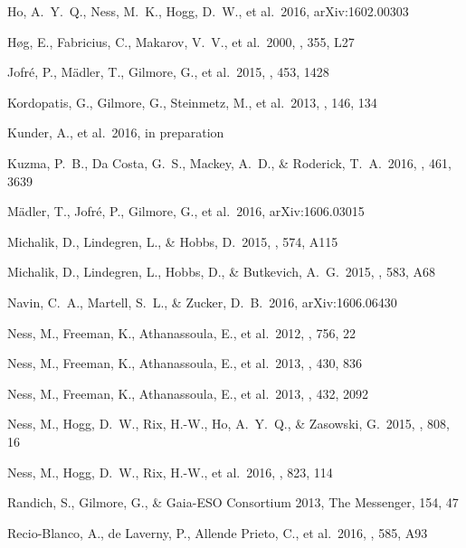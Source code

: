 \documentclass[preprint,trackchanges]{aastex}
\begin{document}
\begin{thebibliography}{dummy}
 Ho, A.~Y.~Q., Ness, M.~K., Hogg, D.~W., et al.\ 2016, arXiv:1602.00303 
 
 H{\o}g, E., Fabricius, C., Makarov, V.~V., et al.\ 2000, \aap, 355, L27 

 Jofr{\'e}, P., M{\"a}dler, T., Gilmore, G., et al.\ 2015, \mnras, 453, 1428 

 Kordopatis, G., Gilmore, G., Steinmetz, M., et al.\ 2013, \aj, 146, 134 

 Kunder, A., et al.\ 2016, in preparation

 Kuzma, P.~B., Da Costa, G.~S., Mackey, A.~D., \& Roderick, T.~A.\ 2016, \mnras, 461, 3639 

 M{\"a}dler, T., Jofr{\'e}, P., Gilmore, G., et al.\ 2016, arXiv:1606.03015 

 Michalik, D., Lindegren, L., \& Hobbs, D.\ 2015, \aap, 574, A115 

 Michalik, D., Lindegren, L., Hobbs, D., \& Butkevich, A.~G.\ 2015, \aap, 583, A68 

 Navin, C.~A., Martell, S.~L., \& Zucker, D.~B.\ 2016, arXiv:1606.06430 

 Ness, M., Freeman, K., Athanassoula, E., et al.\ 2012, \apj, 756, 22 

 Ness, M., Freeman, K., Athanassoula, E., et al.\ 2013, \mnras, 430, 836 

 Ness, M., Freeman, K., Athanassoula, E., et al.\ 2013, \mnras, 432, 2092 

 Ness, M., Hogg, D.~W., Rix, H.-W., Ho, A.~Y.~Q., \& Zasowski, G.\ 2015, \apj, 808, 16 

 Ness, M., Hogg, D.~W., Rix, H.-W., et al.\ 2016, \apj, 823, 114 

 Randich, S., Gilmore, G., \& Gaia-ESO Consortium 2013, The Messenger, 154, 47 

 Recio-Blanco, A., de Laverny, P., Allende Prieto, C., et al.\ 2016, \aap, 585, A93 


\end{thebibliography}
\end{document}
